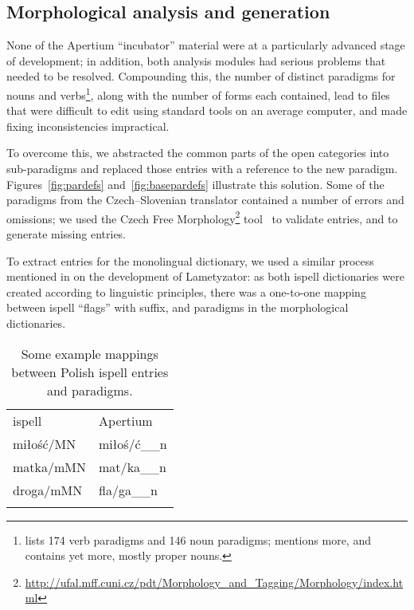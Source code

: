 \documentclass[11pt]{article}
\begin{document}
\subsection{Morphological analysis and generation}

None of the Apertium ``incubator'' material were at a particularly advanced stage of development; in addition, both 
analysis modules had serious problems that needed to be resolved. Compounding this, the 
number of distinct paradigms for nouns and verbs\footnote{\citet{Jagodzinski08} lists 174 verb 
paradigms and 146 noun paradigms; \citet{Bielec98} mentions more, and \citet{Futrega09}
contains yet more, mostly proper nouns.}, along with the number of forms each 
contained, lead to files that were difficult to edit using standard tools on an average 
computer, and made fixing inconsistencies impractical.

To overcome this, we abstracted the common parts of the open categories into sub-paradigms 
and replaced those entries with a reference to the new paradigm. Figures~\ref{fig:pardefs}
and~\ref{fig:basepardefs} illustrate this solution. Some of the paradigms from the Czech--Slovenian
translator contained a number of errors and omissions; we used the Czech Free 
Morphology\footnote{\url{http://ufal.mff.cuni.cz/pdt/Morphology_and_Tagging/Morphology/index.html}}
tool~\citep{Hacic2004} to validate entries, and to generate missing entries.

To extract entries for the monolingual dictionary, we used a similar process mentioned in \cite{Weiss05}
on the development of Lametyzator:
as both ispell dictionaries were created according to linguistic principles, there 
was a one-to-one mapping between ispell ``flags'' with suffix, and paradigms in the 
morphological dictionaries.


\begin{table}
\begin{center}
 \caption{Some example mappings between Polish ispell entries and paradigms.}
 \begin{tabular}{ll}
    \hline\noalign{\smallskip}
    ispell      & Apertium\\
    \noalign{\smallskip}\hline\noalign{\smallskip}
    miłość$/$MN & miłoś$/$ć\_\_n\\
    matka$/$mMN & mat$/$ka\_\_n\\
    droga$/$mMN & fla$/$ga\_\_n\\
    \hline\noalign{\smallskip}
 \end{tabular}
\end{center}
\end{table}
\end{document}
